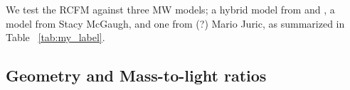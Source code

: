 \documentclass[reprint,%
 amsmath,amssymb,
 aps,
]{revtex4-1}
\begin{document}


  We test the RCFM against three MW models;  a hybrid model from \citet{Xue} and \citet{Sofue}, a model from Stacy McGaugh, and one from (?) Mario Juric, as summarized in Table ~\ref{tab:my_label}.
  
  
 

 


 








 
\subsection{Geometry  and  Mass-to-light ratios}
\end{document}
